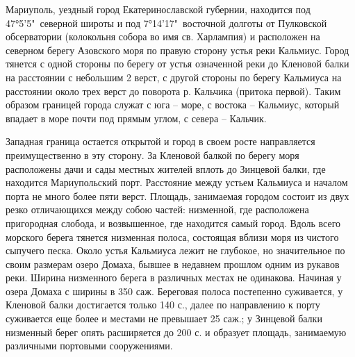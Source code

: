 Мариуполь, уездный город Екатеринославской губернии, находится под 47°5'5"\ 
северной широты и под 7°14'17"\ восточной долготы от Пулковской обсерватории
(колокольня собора во имя св. Харлампия) и расположен на северном берегу
Азовского моря  по правую сторону устья реки Кальмиус. Город тянется с одной
стороны по берегу от устья означенной реки до Кленовой балки на расстоянии с
небольшим 2 верст, с другой стороны по берегу Кальмиуса на расстоянии около
трех верст до поворота р. Кальчика (притока первой). Таким образом границей
города служат с юга – море, с востока – Кальмиус, который впадает в море почти
под прямым углом, с севера – Кальчик. 

Западная граница остается открытой и город в своем росте направляется
преимущественно в эту сторону. За Кленовой балкой по берегу моря расположены
дачи и сады местных жителей вплоть до Зинцевой балки, где находится
Мариупольский порт. Расстояние между устьем Кальмиуса и началом порта не много
более пяти верст. Площадь, занимаемая городом состоит из двух резко
отличающихся между собою частей: низменной, где расположена пригородная
слобода, и возвышенное, где находится самый город.  Вдоль всего морского берега
тянется низменная полоса, состоящая вблизи моря из чистого сыпучего песка.
Около устья Кальмиуса лежит не глубокое, но значительное по своим размерам
озеро Домаха, бывшее в недавнем прошлом одним из рукавов реки. Ширина
низменного берега в различных местах не одинакова. Начиная у озера Домаха с
ширины в 350 саж. Береговая полоса постепенно суживается, у Кленовой балки
достигается только 140 с., далее по направлению к порту суживается еще более и
местами не превышает 25 саж.; у Зинцевой балки низменный берег опять
расширяется до 200 с. и образует площадь, занимаемую различными портовыми
сооружениями. 

